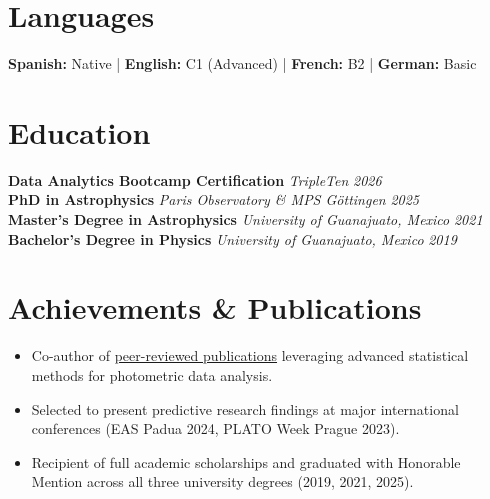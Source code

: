 \documentclass[10pt,a4paper]{article}
\begin{document}
\section*{Languages}
\textbf{Spanish:} Native \quad | \quad \textbf{English:} C1 (Advanced) \quad | \quad \textbf{French:} B2 \quad | \quad \textbf{German:} Basic

\section*{Education}
\textbf{Data Analytics Bootcamp Certification} \hfill \textit{TripleTen} \hfill \textit{2026}\\
\textbf{PhD in Astrophysics} \hfill \textit{Paris Observatory \& MPS Göttingen} \hfill \textit{2025}\\
\textbf{Master's Degree in Astrophysics} \hfill \textit{University of Guanajuato, Mexico} \hfill \textit{2021}\\
\textbf{Bachelor's Degree in Physics} \hfill \textit{University of Guanajuato, Mexico} \hfill \textit{2019}

\section*{Achievements \& Publications}
\begin{itemize}[leftmargin=1.5em]
    \item Co-author of \href{https://ui.adsabs.harvard.edu/search/fq...}{peer-reviewed publications} leveraging advanced statistical methods for photometric data analysis.
    \item Selected to present predictive research findings at major international conferences (EAS Padua 2024, PLATO Week Prague 2023).
    \item Recipient of full academic scholarships and graduated with Honorable Mention across all three university degrees (2019, 2021, 2025).
\end{itemize}
\end{document}
